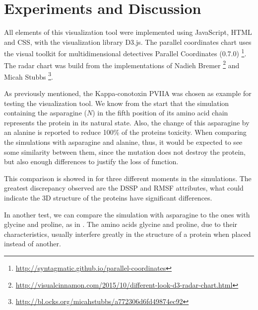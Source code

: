 \documentclass[10pt, conference]{IEEEtran}
\begin{document}
\section{Experiments and Discussion}
%

All elements of this visualization tool were implemented using JavaScript, HTML and CSS, with the visualization library D3.js. The parallel coordinates chart uses the visual toolkit for multidimensional detectives Parallel Coordinates (0.7.0) \footnote{\url{http://syntagmatic.github.io/parallel-coordinates}}. The radar chart was build from the implementations of Nadieh Bremer \footnote{\url{http://visualcinnamon.com/2015/10/different-look-d3-radar-chart.html}} and Micah Stubbs \footnote{\url{http://bl.ocks.org/micahstubbs/a772306d6fd49874ec92}}. 

As previously mentioned, the Kappa-conotoxin PVIIA was chosen as example for testing the visualization tool. We know from the start that the simulation containing the asparagine ($N$) in the fifth position of its amino acid chain represents the protein in its natural state. Also, the change of this asparagine by an alanine is reported to reduce 100\% of the proteins toxicity. When comparing the simulations with asparagine and alanine, thus, it would be expected to see some similarity between them, since the mutation does not destroy the protein, but also enough differences to justify the loss of function. 

This comparison is showed in  for three different moments in the simulations. The greatest discrepancy observed are the DSSP and RMSF attributes, what could indicate the 3D structure of the proteins have significant differences.


In another test, we can compare the simulation with asparagine to the ones with glycine and proline, as in . The amino acids glycine and proline, due to their characteristics, usually interfere greatly in the structure of a protein when placed instead of another.

\end{document}
